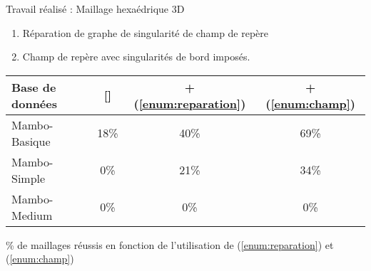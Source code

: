 \begin{frame}{Travail réalisé : Maillage hexaédrique 3D}
    \centering
    \begin{enumerate}
        \item Réparation de graphe de singularité de champ de repère \label{enum:reparation}
        \item Champ de repère avec singularités de bord imposés. \label{enum:champ}
    \end{enumerate}
    \begin{table}
    \centering
    \begin{tabular}{|l|c|c|c|}
    \hline
    Base de données & [\cite{ray_practical_2016}] & + (\ref{enum:reparation}) & + (\ref{enum:champ}) \\
    \hline
    Mambo-Basique & 18\% & 40\% & 69\% \\
    \hline
    Mambo-Simple & 0\% & 21\% & 34\% \\
    \hline
    Mambo-Medium & 0\% & 0\% & 0\% \\
    \hline
    \end{tabular}
    \end{table}
    \% de maillages réussis  en fonction de l'utilisation de (\ref{enum:reparation}) et (\ref{enum:champ})
\end{frame}

\iffalse
\begin{frame}{Perspectives}
    \textbf{Maillage quadrilatère:}
    \begin{itemize}
        \item Correction champ de repère : Résoudre les problèmes de non-intégrabilité sans trop affecter la qualité.
        \item Intégrabilité champ de repère : Optimiser le placement des singularités sans trop affecter les performances.
    \end{itemize}
    \pause
    \textbf{Maillage hexaédrique:}
    \begin{itemize}
        \item Initialisation champ de repère : Méthode automatique pour déterminer des valences sur le bord valides.
        \item Correction champ de repère : Méthode de correction robuste des graphes de singularités intérieurs [\cite{liu2023locally}].
        \item Quantification rapide : Résoudre le problème de quantification par une méthode gloutonne comme en 2D.
    \end{itemize}
\end{frame}
\fi


